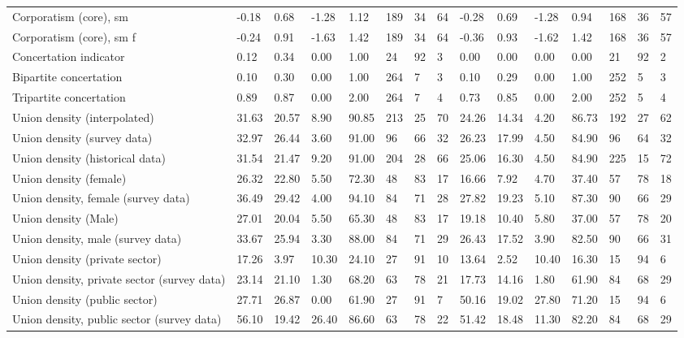 \begin{longtable}{lllllllllllllll}
\addlinespace
Corporatism (core), sm & -0.18 & 0.68 & -1.28 & 1.12 & 189 & 34 & 64 & -0.28 & 0.69 & -1.28 & 0.94 & 168 & 36 & 57\\
Corporatism (core), sm f & -0.24 & 0.91 & -1.63 & 1.42 & 189 & 34 & 64 & -0.36 & 0.93 & -1.62 & 1.42 & 168 & 36 & 57\\
Concertation indicator & 0.12 & 0.34 & 0.00 & 1.00 & 24 & 92 & 3 & 0.00 & 0.00 & 0.00 & 0.00 & 21 & 92 & 2\\
Bipartite concertation & 0.10 & 0.30 & 0.00 & 1.00 & 264 & 7 & 3 & 0.10 & 0.29 & 0.00 & 1.00 & 252 & 5 & 3\\
Tripartite concertation & 0.89 & 0.87 & 0.00 & 2.00 & 264 & 7 & 4 & 0.73 & 0.85 & 0.00 & 2.00 & 252 & 5 & 4\\
\addlinespace
Union density (interpolated) & 31.63 & 20.57 & 8.90 & 90.85 & 213 & 25 & 70 & 24.26 & 14.34 & 4.20 & 86.73 & 192 & 27 & 62\\
Union density (survey data) & 32.97 & 26.44 & 3.60 & 91.00 & 96 & 66 & 32 & 26.23 & 17.99 & 4.50 & 84.90 & 96 & 64 & 32\\
Union density (historical data) & 31.54 & 21.47 & 9.20 & 91.00 & 204 & 28 & 66 & 25.06 & 16.30 & 4.50 & 84.90 & 225 & 15 & 72\\
Union density (female) & 26.32 & 22.80 & 5.50 & 72.30 & 48 & 83 & 17 & 16.66 & 7.92 & 4.70 & 37.40 & 57 & 78 & 18\\
Union density, female (survey data) & 36.49 & 29.42 & 4.00 & 94.10 & 84 & 71 & 28 & 27.82 & 19.23 & 5.10 & 87.30 & 90 & 66 & 29\\
\addlinespace
Union density (Male) & 27.01 & 20.04 & 5.50 & 65.30 & 48 & 83 & 17 & 19.18 & 10.40 & 5.80 & 37.00 & 57 & 78 & 20\\
Union density, male (survey data) & 33.67 & 25.94 & 3.30 & 88.00 & 84 & 71 & 29 & 26.43 & 17.52 & 3.90 & 82.50 & 90 & 66 & 31\\
Union density (private sector) & 17.26 & 3.97 & 10.30 & 24.10 & 27 & 91 & 10 & 13.64 & 2.52 & 10.40 & 16.30 & 15 & 94 & 6\\
Union density, private sector (survey data) & 23.14 & 21.10 & 1.30 & 68.20 & 63 & 78 & 21 & 17.73 & 14.16 & 1.80 & 61.90 & 84 & 68 & 29\\
Union density (public sector) & 27.71 & 26.87 & 0.00 & 61.90 & 27 & 91 & 7 & 50.16 & 19.02 & 27.80 & 71.20 & 15 & 94 & 6\\
\addlinespace
Union density, public sector (survey data) & 56.10 & 19.42 & 26.40 & 86.60 & 63 & 78 & 22 & 51.42 & 18.48 & 11.30 & 82.20 & 84 & 68 & 29\\

\end{longtable}

